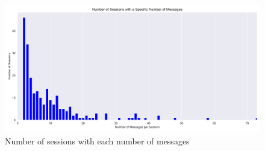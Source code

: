 \begin{figure}[H]
    \centering
    \includegraphics[width=\textwidth]{results/plots/assets/usage-13-number-of-sessions-with-number-of-messages.png}
    \caption{Number of sessions with each number of messages}
    \label{fig:usage_13_number_of_sessions_with_number_of_messages}
\end{figure}